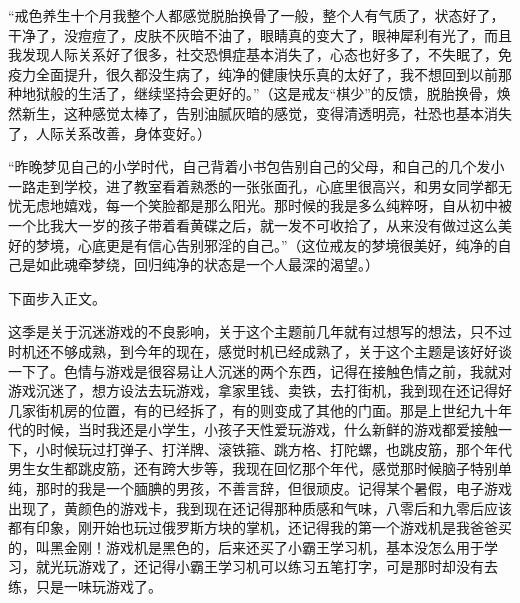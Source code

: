 \begin{case}
    “戒色养生十个月我整个人都感觉脱胎换骨了一般，整个人有气质了，状态好了，干净了，没痘痘了，皮肤不灰暗不油了，眼睛真的变大了，眼神犀利有光了，而且我发现人际关系好了很多，社交恐惧症基本消失了，心态也好多了，不失眠了，免疫力全面提升，很久都没生病了，纯净的健康快乐真的太好了，我不想回到以前那种地狱般的生活了，继续坚持会更好的。”（这是戒友“棋少”的反馈，脱胎换骨，焕然新生，这种感觉太棒了，告别油腻灰暗的感觉，变得清透明亮，社恐也基本消失了，人际关系改善，身体变好。）

    “昨晚梦见自己的小学时代，自己背着小书包告别自己的父母，和自己的几个发小一路走到学校，进了教室看着熟悉的一张张面孔，心底里很高兴，和男女同学都无忧无虑地嬉戏，每一个笑脸都是那么阳光。那时候的我是多么纯粹呀，自从初中被一个比我大一岁的孩子带着看黄碟之后，就一发不可收拾了，从来没有做过这么美好的梦境，心底更是有信心告别邪淫的自己。”（这位戒友的梦境很美好，纯净的自己是如此魂牵梦绕，回归纯净的状态是一个人最深的渴望。）
\end{case}

下面步入正文。

这季是关于沉迷游戏的不良影响，关于这个主题前几年就有过想写的想法，只不过时机还不够成熟，到今年的现在，感觉时机已经成熟了，关于这个主题是该好好谈一下了。色情与游戏是很容易让人沉迷的两个东西，记得在接触色情之前，我就对游戏沉迷了，想方设法去玩游戏，拿家里钱、卖铁，去打街机，我到现在还记得好几家街机房的位置，有的已经拆了，有的则变成了其他的门面。那是上世纪九十年代的时候，当时我还是小学生，小孩子天性爱玩游戏，什么新鲜的游戏都爱接触一下，小时候玩过打弹子、打洋牌、滚铁箍、跳方格、打陀螺，也跳皮筋，那个年代男生女生都跳皮筋，还有跨大步等，我现在回忆那个年代，感觉那时候脑子特别单纯，那时的我是一个腼腆的男孩，不善言辞，但很顽皮。记得某个暑假，电子游戏出现了，黄颜色的游戏卡，我到现在还记得那种质感和气味，八零后和九零后应该都有印象，刚开始也玩过俄罗斯方块的掌机，还记得我的第一个游戏机是我爸爸买的，叫黑金刚！游戏机是黑色的，后来还买了小霸王学习机，基本没怎么用于学习，就光玩游戏了，还记得小霸王学习机可以练习五笔打字，可是那时却没有去练，只是一味玩游戏了。

